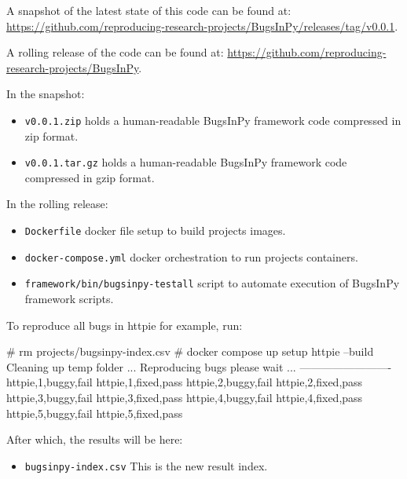 \documentclass[conference]{IEEEtran}
\begin{document}

A snapshot of the latest state of this code can be found at: \url{https://github.com/reproducing-research-projects/BugsInPy/releases/tag/v0.0.1}.

A rolling release of the code can be found at: \url{https://github.com/reproducing-research-projects/BugsInPy}.

In the snapshot:
\begin{itemize}
  \item \texttt{v0.0.1.zip} holds a human-readable BugsInPy framework code compressed in zip format.
  \item \texttt{v0.0.1.tar.gz} holds a human-readable BugsInPy framework code compressed in gzip format.
\end{itemize}

In the rolling release:
\begin{itemize}
  \item \texttt{Dockerfile} docker file setup to build projects images.
  \item \texttt{docker-compose.yml} docker orchestration to run projects containers.
  \item \texttt{framework/bin/bugsinpy-testall} script to automate execution of BugsInPy framework scripts.
\end{itemize}

To reproduce all bugs in httpie for example, run: 

\begin{verbatim*}
# rm projects/bugsinpy-index.csv
# docker compose up setup httpie --build
Cleaning up temp folder ...
Reproducing bugs please wait ...
-------------------------
httpie,1,buggy,fail
httpie,1,fixed,pass
httpie,2,buggy,fail
httpie,2,fixed,pass
httpie,3,buggy,fail
httpie,3,fixed,pass
httpie,4,buggy,fail
httpie,4,fixed,pass
httpie,5,buggy,fail
httpie,5,fixed,pass
\end{verbatim*}

After which, the results will be here:

\begin{itemize}
\item \texttt{bugsinpy-index.csv} This is the new result index.
\end{itemize}
\end{document}
